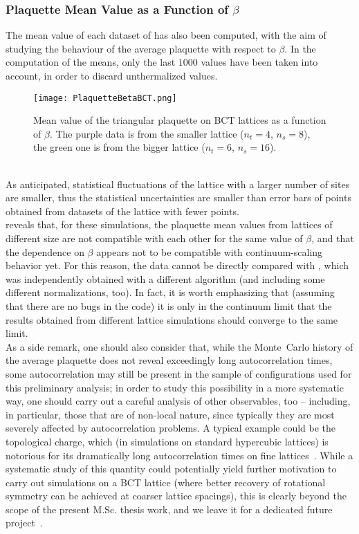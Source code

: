 \subsubsection{Plaquette Mean Value as a Function of $\beta$}
The mean value of each dataset of  has also been computed, with the aim of studying the behaviour of the average plaquette with respect to $\beta$.
In the computation of the means, only the last $1000$ values have been taken into account, in order to discard unthermalized values.
\begin{figure}[!htbp]
    \centering
    \texttt{[image: PlaquetteBetaBCT.png]}
    \caption{Mean value of the triangular plaquette on BCT lattices as a function of $\beta$. The purple data is from the smaller lattice ($n_t=4$, $n_s=8$), the green one is from the bigger lattice ($n_t=6$, $n_s=16$).}
    \label{4F:PlaqBetaBCT}
\end{figure}\\
As anticipated, statistical fluctuations of the lattice with a larger number of sites are smaller, thus the statistical uncertainties are smaller than error bars of points obtained from datasets of the lattice with fewer points.\\
 reveals that, for these simulations, the plaquette mean values from lattices of different size are not compatible with each other for the same value of $\beta$, and that the dependence on $\beta$ appears not to be compatible with continuum-scaling behavior yet. For this reason, the data cannot be directly compared with , which was independently obtained with a different algorithm (and including some different normalizations, too). In fact, it is worth emphasizing that (assuming that there are no bugs in the code) it is only in the continuum limit that the results obtained from different lattice simulations should converge to the same limit.\\
As a side remark, one should also consider that, while the Monte~Carlo history of the average plaquette does not reveal exceedingly long autocorrelation times, some autocorrelation may still be present in the sample of configurations used for this preliminary analysis; in order to study this possibility in a more systematic way, one should carry out a careful analysis of other observables, too -- including, in particular, those that are of non-local nature, since typically they are most severely affected by autocorrelation problems. A typical example could be the topological charge, which (in simulations on standard hypercubic lattices) is notorious for its dramatically long autocorrelation times on fine lattices~\cite{Schaefer:2010hu}. While a systematic study of this quantity could potentially yield further motivation to carry out simulations on a BCT lattice (where better recovery of rotational symmetry can be achieved at coarser lattice spacings), this is clearly beyond the scope of the present M.Sc. thesis work, and we leave it for a dedicated future project~\cite{Aliberti:2024soa}.
